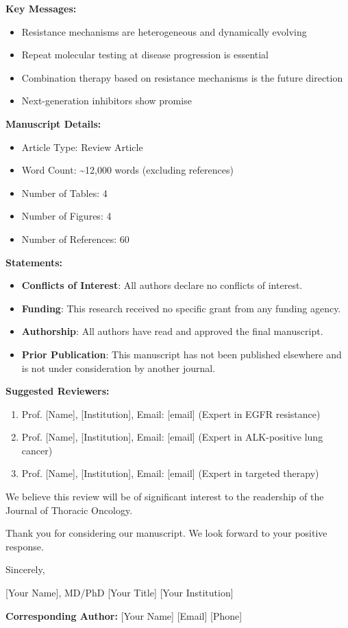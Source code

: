 \textbf{Key Messages:}
\begin{itemize}
    \item Resistance mechanisms are heterogeneous and dynamically evolving
    \item Repeat molecular testing at disease progression is essential
    \item Combination therapy based on resistance mechanisms is the future direction
    \item Next-generation inhibitors show promise
\end{itemize}

\textbf{Manuscript Details:}
\begin{itemize}
    \item Article Type: Review Article
    \item Word Count: \textasciitilde12,000 words (excluding references)
    \item Number of Tables: 4
    \item Number of Figures: 4
    \item Number of References: 60
\end{itemize}

\textbf{Statements:}
\begin{itemize}
    \item \textbf{Conflicts of Interest}: All authors declare no conflicts of interest.
    \item \textbf{Funding}: This research received no specific grant from any funding agency.
    \item \textbf{Authorship}: All authors have read and approved the final manuscript.
    \item \textbf{Prior Publication}: This manuscript has not been published elsewhere and is not under consideration by another journal.
\end{itemize}

\textbf{Suggested Reviewers:}
\begin{enumerate}
    \item Prof. [Name], [Institution], Email: [email] (Expert in EGFR resistance)
    \item Prof. [Name], [Institution], Email: [email] (Expert in ALK-positive lung cancer)
    \item Prof. [Name], [Institution], Email: [email] (Expert in targeted therapy)
\end{enumerate}

We believe this review will be of significant interest to the readership of the Journal of Thoracic Oncology.

Thank you for considering our manuscript. We look forward to your positive response.

Sincerely,

[Your Name], MD/PhD
[Your Title]
[Your Institution]

\textbf{Corresponding Author:}
[Your Name]
[Email]
[Phone]
